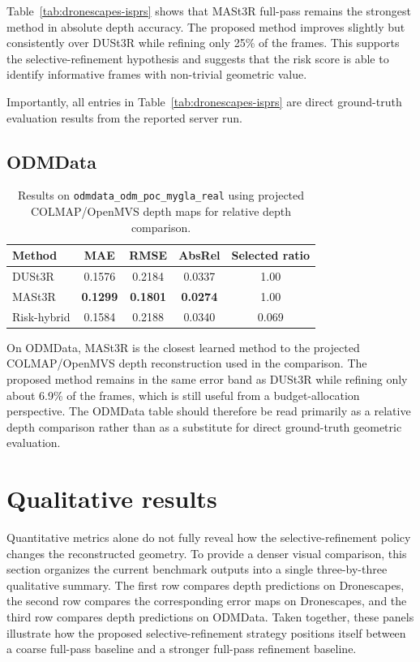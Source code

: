 \documentclass[preprint,12pt]{elsarticle}
\begin{document}
Table~\ref{tab:dronescapes-isprs} shows that MASt3R full-pass remains the strongest method in absolute depth accuracy. The proposed method improves slightly but consistently over DUSt3R while refining only 25\% of the frames. This supports the selective-refinement hypothesis and suggests that the risk score is able to identify informative frames with non-trivial geometric value.

Importantly, all entries in Table~\ref{tab:dronescapes-isprs} are direct ground-truth evaluation results from the reported server run.

\subsection{ODMData}

\begin{table}[t]
\centering
\small
\begin{tabular}{lcccc}
\toprule
Method & MAE & RMSE & AbsRel & Selected ratio \\
\midrule
DUSt3R & 0.1576 & 0.2184 & 0.0337 & 1.00 \\
MASt3R & \textbf{0.1299} & \textbf{0.1801} & \textbf{0.0274} & 1.00 \\
Risk-hybrid & 0.1584 & 0.2188 & 0.0340 & 0.069 \\
\bottomrule
\end{tabular}
\caption{Results on \texttt{odmdata\_odm\_poc\_mygla\_real} using projected COLMAP/OpenMVS depth maps for relative depth comparison.}
\label{tab:odm-isprs}
\end{table}

On ODMData, MASt3R is the closest learned method to the projected COLMAP/OpenMVS depth reconstruction used in the comparison. The proposed method remains in the same error band as DUSt3R while refining only about 6.9\% of the frames, which is still useful from a budget-allocation perspective. The ODMData table should therefore be read primarily as a relative depth comparison rather than as a substitute for direct ground-truth geometric evaluation.

\section{Qualitative results}

Quantitative metrics alone do not fully reveal how the selective-refinement policy changes the reconstructed geometry. To provide a denser visual comparison, this section organizes the current benchmark outputs into a single three-by-three qualitative summary. The first row compares depth predictions on Dronescapes, the second row compares the corresponding error maps on Dronescapes, and the third row compares depth predictions on ODMData. Taken together, these panels illustrate how the proposed selective-refinement strategy positions itself between a coarse full-pass baseline and a stronger full-pass refinement baseline.
\end{document}

